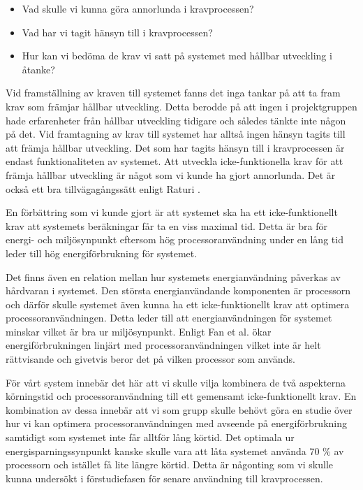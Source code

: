 \begin{itemize}
	\item Vad skulle vi kunna göra annorlunda i kravprocessen?
	\item Vad har vi tagit hänsyn till i kravprocessen?
	\item Hur kan vi bedöma de krav vi satt på systemet med hållbar utveckling i åtanke?
\end{itemize}

Vid framställning av kraven till systemet fanns det inga tankar på att ta fram krav som främjar hållbar utveckling. Detta berodde på att ingen i projektgruppen hade erfarenheter från hållbar utveckling tidigare och således tänkte inte någon på det. Vid framtagning av krav till systemet har alltså ingen hänsyn tagits till att främja hållbar utveckling. Det som har tagits hänsyn till i kravprocessen är endast funktionaliteten av systemet. Att utveckla icke-funktionella krav för att främja hållbar utveckling är något som vi kunde ha gjort annorlunda. Det är också ett bra tillvägagångssätt enligt Raturi \cite{raturi2014developing}.

En förbättring som vi kunde gjort är att systemet ska ha ett icke-funktionellt krav att systemets beräkningar får ta en viss maximal tid. Detta är bra för energi- och miljösynpunkt eftersom hög processoranvändning under en lång tid leder till hög energiförbrukning för systemet.

Det finns även en relation mellan hur systemets energianvändning påverkas av hårdvaran i systemet. Den största energianvändande komponenten är processorn och därför skulle systemet även kunna ha ett icke-funktionellt krav att optimera processoranvändningen. Detta leder till att energianvändningen för systemet minskar vilket är bra ur miljösynpunkt. Enligt Fan et al. \cite{fan2007power} ökar energiförbrukningen linjärt med processoranvändningen vilket inte är helt rättvisande och givetvis beror det på vilken processor som används.

För vårt system innebär det här att vi skulle vilja kombinera de två aspekterna körningstid och processoranvändning till ett gemensamt icke-funktionellt krav. En kombination av dessa innebär att vi som grupp skulle behövt göra en studie över hur vi kan optimera processoranvändningen med avseende på energiförbrukning samtidigt som systemet inte får alltför lång körtid. Det optimala ur energisparningssynpunkt kanske skulle vara att låta systemet använda 70 \% av processorn och istället få lite längre körtid. Detta är någonting som vi skulle kunna undersökt i förstudiefasen för senare användning till kravprocessen.

